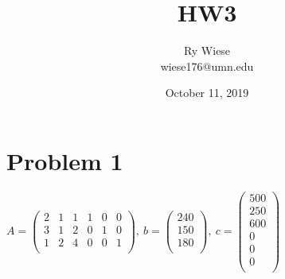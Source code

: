 \documentclass{article}
\title{HW3}
\author{Ry Wiese\\wiese176@umn.edu}
\date{October 11, 2019}
\begin{document}
\maketitle

\section{Problem 1}

$A = 
\left(
    \begin{array}{cccccc}
        2 & 1 & 1 & 1 & 0 & 0\\
        3 & 1 & 2 & 0 & 1 & 0\\
        1 & 2 & 4 & 0 & 0 & 1\\
    \end{array}
\right),~
b = 
\left(
    \begin{array}{c}
        240\\
        150\\
        180\\
    \end{array}
\right),~ 
c = 
\left(
    \begin{array}{c}
        500\\
        250\\
        600\\
        0\\
        0\\
        0\\
    \end{array}
\right)$
\end{document}
